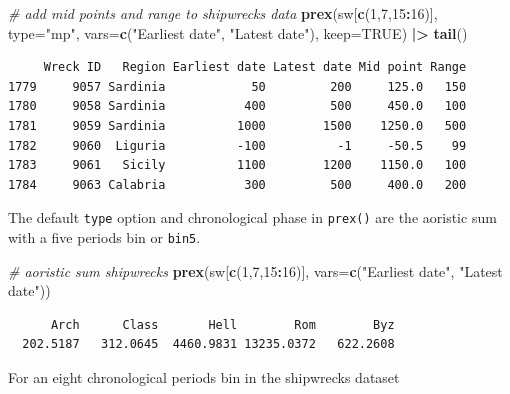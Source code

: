 \documentclass[a4paper,11pt]{memoir}
\newenvironment{Shaded}{\begin{snugshade}}{\end{snugshade}}
\newcommand{\CommentTok}[1]{\textcolor[rgb]{0.56,0.35,0.01}{\textit{#1}}}
\newcommand{\DataTypeTok}[1]{\textcolor[rgb]{0.13,0.29,0.53}{#1}}
\newcommand{\DecValTok}[1]{\textcolor[rgb]{0.00,0.00,0.81}{#1}}
\newcommand{\ErrorTok}[1]{\textcolor[rgb]{0.64,0.00,0.00}{\textbf{#1}}}
\newcommand{\KeywordTok}[1]{\textcolor[rgb]{0.13,0.29,0.53}{\textbf{#1}}}
\newcommand{\NormalTok}[1]{#1}
\newcommand{\OperatorTok}[1]{\textcolor[rgb]{0.81,0.36,0.00}{\textbf{#1}}}
\newcommand{\OtherTok}[1]{\textcolor[rgb]{0.56,0.35,0.01}{#1}}
\newcommand{\StringTok}[1]{\textcolor[rgb]{0.31,0.60,0.02}{#1}}
\begin{document}
\begin{Shaded}
\begin{Highlighting}[]
\CommentTok{# add mid points and range to shipwrecks data}
\KeywordTok{prex}\NormalTok{(sw[}\KeywordTok{c}\NormalTok{(}\DecValTok{1}\NormalTok{,}\DecValTok{7}\NormalTok{,}\DecValTok{15}\OperatorTok{:}\DecValTok{16}\NormalTok{)], }\DataTypeTok{type=}\StringTok{"mp"}\NormalTok{, }\DataTypeTok{vars=}\KeywordTok{c}\NormalTok{(}\StringTok{"Earliest date"}\NormalTok{, }\StringTok{"Latest date"}\NormalTok{), }\DataTypeTok{keep=}\OtherTok{TRUE}\NormalTok{) }\OperatorTok{|}\ErrorTok{>}\StringTok{ }
\StringTok{  }\KeywordTok{tail}\NormalTok{()}
\end{Highlighting}
\end{Shaded}

\begin{verbatim}
     Wreck ID   Region Earliest date Latest date Mid point Range
1779     9057 Sardinia            50         200     125.0   150
1780     9058 Sardinia           400         500     450.0   100
1781     9059 Sardinia          1000        1500    1250.0   500
1782     9060  Liguria          -100          -1     -50.5    99
1783     9061   Sicily          1100        1200    1150.0   100
1784     9063 Calabria           300         500     400.0   200
\end{verbatim}

The default \texttt{\textquotesingle{}type\textquotesingle{}} option and
chronological phase in \texttt{prex()} are the aoristic sum with a five
periods bin or \texttt{bin5}.

\begin{Shaded}
\begin{Highlighting}[]
\CommentTok{# aoristic sum shipwrecks}
\KeywordTok{prex}\NormalTok{(sw[}\KeywordTok{c}\NormalTok{(}\DecValTok{1}\NormalTok{,}\DecValTok{7}\NormalTok{,}\DecValTok{15}\OperatorTok{:}\DecValTok{16}\NormalTok{)], }\DataTypeTok{vars=}\KeywordTok{c}\NormalTok{(}\StringTok{"Earliest date"}\NormalTok{, }\StringTok{"Latest date"}\NormalTok{))}
\end{Highlighting}
\end{Shaded}

\begin{verbatim}
      Arch      Class       Hell        Rom        Byz 
  202.5187   312.0645  4460.9831 13235.0372   622.2608 
\end{verbatim}

For an eight chronological periods bin in the shipwrecks dataset
\end{document}

